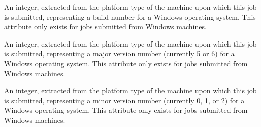 \begin{description}
\item[\AdAttr{WindowsBuildNumber}:] An integer, extracted from the
platform type of the machine upon which this job is submitted,
representing a build number for a Windows operating system.
This attribute only exists for jobs submitted from Windows machines.

\item[\AdAttr{WindowsMajorVersion}:] An integer, extracted from the
platform type of the machine upon which this job is submitted,
representing a major version number (currently 5 or 6)
for a Windows operating system.
This attribute only exists for jobs submitted from Windows machines.

\item[\AdAttr{WindowsMinorVersion}:] An integer, extracted from the
platform type of the machine upon which this job is submitted, 
representing a minor version number (currently 0, 1, or 2)
for a Windows operating system.
This attribute only exists for jobs submitted from Windows machines.

\end{description}
